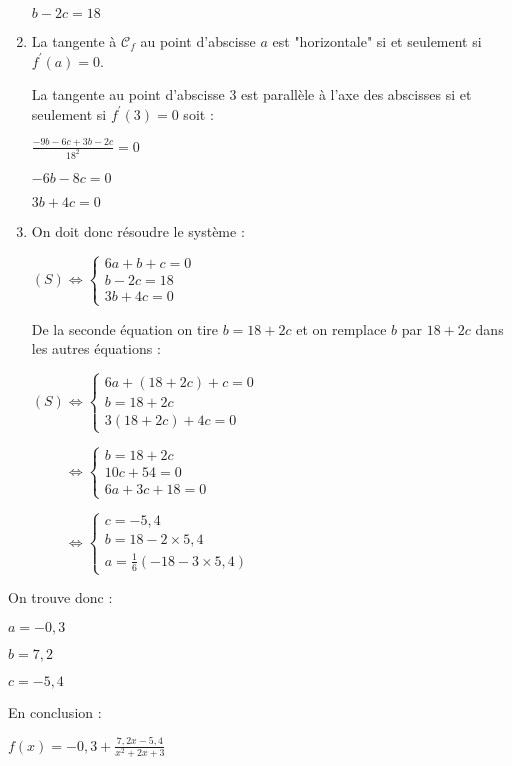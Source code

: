\begin{corrige}
\begin{enumerate}
          $b-2c=18$
          \item
          \begin{note}La tangente à $\mathscr C_f$ au point d'abscisse $a$ est "horizontale" si et seulement si $f^{\prime}\left(a\right)=0$.\end{note}
          La tangente au point d'abscisse 3 est parallèle à l'axe des abscisses si et seulement si $f^{\prime}\left(3\right)=0$ soit :
          \par
          $\frac{-9b-6c+3b-2c}{18^{2}}=0$
          \par
          $-6b-8c=0$
          \par
          $3b+4c=0$
          \item
          On doit donc résoudre le système :
          \par
          $\left(S\right) \Leftrightarrow \left\{ \begin{matrix} 6a+b+c=0 \\ b-2c=18 \\ 3b+4c=0 \end{matrix}\right.$
               \par
               De la seconde équation on tire $b=18+2c$ et on remplace $b$ par $18+2c$ dans les autres équations :
               \par
               $\left(S\right) \Leftrightarrow \left\{ \begin{matrix} 6a+\left(18+2c\right)+c=0 \\ b=18+2c \\ 3\left(18+2c\right)+4c=0 \end{matrix}\right.$
                    \par
                    $\phantom{\left(S\right)} \Leftrightarrow \left\{ \begin{matrix} b=18+2c \\ 10c+54=0 \\ 6a+3c+18=0 \end{matrix}\right.$
                         \par
                         $\phantom{\left(S\right)} \Leftrightarrow \left\{ \begin{matrix} c=-5,4 \\ b=18-2\times 5,4 \\ a=\frac{1}{6}\left(-18 -3\times 5,4\right) \end{matrix}\right.$
                         \end{enumerate}
                         On trouve donc :
                         \par
                         $a=-0,3$
                         \par
                         $b=7,2$
                         \par
                         $c=-5,4$
                         \par
                         En conclusion :
                         \par
                         $f\left(x\right)=-0,3+\frac{7,2x-5,4}{x^{2}+2x+3}$


\begin{center}
\end{center}
\end{corrige}
